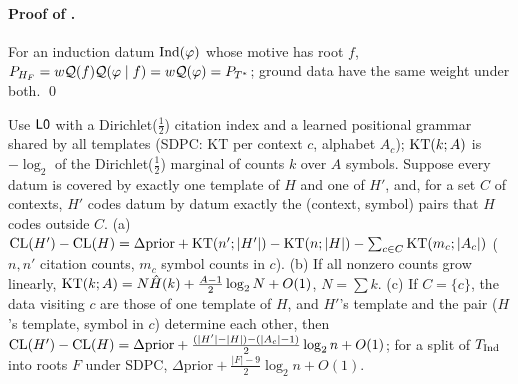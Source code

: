 \paragraph{Proof of .} For an induction datum $\mathrm{Ind}(\varphi)$ whose motive has root $f$, $P_{H_F}=w\mathcal{Q}(f)\mathcal{Q}(\varphi\mid f)=w\mathcal{Q}(\varphi)=P_{T^*}$; ground data have the same weight under both. \qed

\begin{proposition}\pabrk{}\label{prop:pa:occam}
Use $\mathord{\mathsf{L0}}$ with a Dirichlet($\frac12$) citation index and a learned positional grammar shared by all templates (SDPC: KT per context $c$, alphabet $A_c$); $\mathrm{KT}(k;A)$ is $-\log_2$ of the Dirichlet($\frac12$) marginal of counts $k$ over $A$ symbols. Suppose every datum is covered by exactly one template of $H$ and one of $H'$, and, for a set $C$ of contexts, $H'$ codes datum by datum exactly the (context, symbol) pairs that $H$ codes outside $C$.
(a) $\mathrm{CL}(H')-\mathrm{CL}(H)=\Delta\mathrm{prior}+\mathrm{KT}(n';|H'|)-\mathrm{KT}(n;|H|)-\sum_{c\in C}\mathrm{KT}(m_c;|A_c|)$ ($n,n'$ citation counts, $m_c$ symbol counts in $c$).
(b) If all nonzero counts grow linearly, $\mathrm{KT}(k;A)=N\hat H(k)+\frac{A-1}2\log_2N+O(1)$, $N=\sum k$.
(c) If $C=\{c\}$, the data visiting $c$ are those of one template of $H$, and $H'$'s template and the pair ($H$'s template, symbol in $c$) determine each other, then $\mathrm{CL}(H')-\mathrm{CL}(H)=\Delta\mathrm{prior}+\frac{(|H'|-|H|)-(|A_c|-1)}2\log_2n+O(1)$; for a split of $T_{\mathrm{Ind}}$ into roots $F$ under SDPC, $\Delta\mathrm{prior}+\frac{|F|-9}2\log_2n+O(1)$.
\end{proposition}

